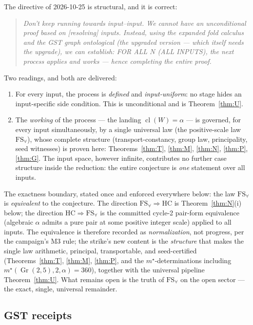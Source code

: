 \documentclass[11pt]{article}
\newcommand{\cl}{\operatorname{cl}}
\newcommand{\Gr}{\operatorname{Gr}}
\newcommand{\FS}{\mathrm{FS}_\forall}
\begin{document}
The directive of 2026-10-25 is structural, and it is correct:
\begin{quote}
\emph{Don't keep running towards input--input.  We cannot have an
unconditional proof based on [resolving] inputs.  Instead, using the expanded
fold calculus and the GST graph ontological (the upgraded version --- which
itself needs the upgrade), we can establish: FOR ALL $N$ (ALL INPUTS), the
next process applies and works --- hence completing the entire proof.}
\end{quote}
Two readings, and both are delivered:
\begin{enumerate}
\item[\textup{(APPLIES)}] For every input, the process is \emph{defined} and
\emph{input-uniform}: no stage hides an input-specific side condition.  This
is unconditional and is Theorem~\ref{thm:U}.
\item[\textup{(WORKS)}] The \emph{working} of the process --- the landing
$\cl(W)=\alpha$ --- is governed, for every input simultaneously, by a single
universal law (the positive-scale law $\FS$), whose complete structure
(transport-constancy, group law, principality, seed witnesses) is proven
here: Theorems~\ref{thm:T}, \ref{thm:M}, \ref{thm:N}, \ref{thm:P},
\ref{thm:G}.  The input space, however infinite, contributes no further case
structure inside the reduction: the entire conjecture is \emph{one} statement
over all inputs.
\end{enumerate}
The exactness boundary, stated once and enforced everywhere below: the law
$\FS$ is \emph{equivalent} to the conjecture.  The direction
$\FS\Rightarrow\mathrm{HC}$ is Theorem~\ref{thm:N}(i) below; the direction
$\mathrm{HC}\Rightarrow\FS$ is the committed cycle-2 pair-form equivalence
(algebraic $\alpha$ admits a pure pair at some positive integer scale) applied
to all inputs.  The equivalence is therefore recorded as \emph{normalization},
not progress, per the campaign's M3 rule; the strike's new content is the
\emph{structure} that makes the single law arithmetic, principal,
transportable, and seed-certified (Theorems~\ref{thm:T}, \ref{thm:M},
\ref{thm:P}, and the $m^\star$-determinations including
$m^\star(\Gr(2,5),2,\alpha)=360$), together with the universal pipeline
Theorem~\ref{thm:U}.  What remains open is the truth of $\FS$ on the open
sector --- the exact, single, universal remainder.

\subsection{GST receipts}
\end{document}
